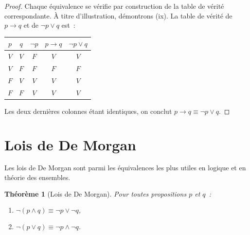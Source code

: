 \documentclass[12pt,a4paper,openany]{book}
\theoremstyle{definition}
\theoremstyle{plain}
\newtheorem{theoreme}[definition]{Théorème}
\theoremstyle{remark}
\begin{document}
\begin{proof}
  Chaque \'equivalence se v\'erifie par construction de la table de v\'erit\'e correspondante. \`A titre d'illustration, d\'emontrons (ix). La table de v\'erit\'e de $p \to q$ et de $\neg p \lor q$ est~:
  \begin{center}
  \begin{tabular}{cc|c|c|c}
    \toprule
    $p$ & $q$ & $\neg p$ & $p \to q$ & $\neg p \lor q$ \\ \midrule
    $V$ & $V$ & $F$ & $V$ & $V$ \\
    $V$ & $F$ & $F$ & $F$ & $F$ \\
    $F$ & $V$ & $V$ & $V$ & $V$ \\
    $F$ & $F$ & $V$ & $V$ & $V$ \\
    \bottomrule
  \end{tabular}
  \end{center}
  Les deux derni\`eres colonnes \'etant identiques, on conclut $p \to q \equiv \neg p \lor q$.
\end{proof}

\section{Lois de De Morgan}
\label{sec:de-morgan}

Les lois de De Morgan sont parmi les \'equivalences les plus utiles en logique et en th\'eorie des ensembles.

\begin{theoreme}[Lois de De Morgan]\label{thm:de-morgan}
  Pour toutes propositions $p$ et $q$~:
  \begin{enumerate}[label=(\roman*)]
    \item $\neg(p \land q) \equiv \neg p \lor \neg q$,
    \item $\neg(p \lor q) \equiv \neg p \land \neg q$.
  \end{enumerate}
\end{theoreme}
\end{document}
